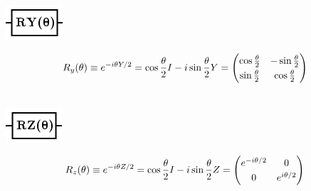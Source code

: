 \documentclass[10pt]{article}
\theoremstyle{definition}
\begin{document}
\begin{itemize}
\begin{center}
\includegraphics[scale=.7]{Figures/Gates/RotYGateViewer}  
  \begin{minipage}{.9\linewidth}
    \begin{equation*} \label{mat:Swap}
    \renewcommand{\arraystretch}{1.25}
R_y(\theta) \equiv e^{-i\theta Y/2} = \cos\frac{\theta}{2} I - i \sin \frac{\theta}{2} Y =  \begin{pmatrix} \cos \frac{\theta}{2} & -\sin\frac{\theta}{2} \\ \sin\frac{\theta}{2} & \cos\frac{\theta}{2}\end{pmatrix}
    \end{equation*}
  \end{minipage}\hspace{-2.5cm}
  \begin{minipage}{.2\linewidth}
  \vspace*{3pt}
    \begin{align}
    \end{align}
  \end{minipage}
\end{center}

\begin{center}
\includegraphics[scale=.7]{Figures/Gates/RotZGateViewer} 
  \begin{minipage}{.9\linewidth}
    \begin{equation*} \label{mat:Swap}
    \renewcommand{\arraystretch}{1.25}
R_z(\theta) \equiv e^{-i\theta Z/2} = \cos\frac{\theta}{2} I - i \sin \frac{\theta}{2} Z =  \begin{pmatrix} e^{-i\theta/2} & 0 \\ 0 & e^{i \theta/2}\end{pmatrix}
    \end{equation*}
  \end{minipage}\hspace{-2.5cm}
  \begin{minipage}{.2\linewidth}
  \vspace*{3pt}
    \begin{align}
    \end{align}
  \end{minipage}
\end{center}


\end{itemize}
\end{document}
